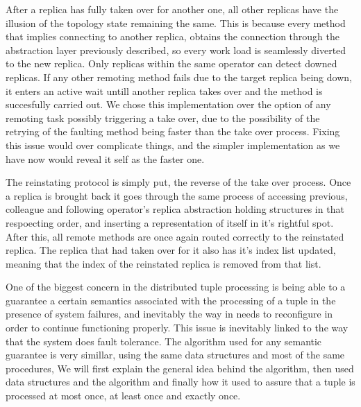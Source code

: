 \documentclass[times, 10pt,twocolumn]{article}
\begin{document}
After a replica has fully taken over for another one, all other replicas have the illusion of the topology state remaining the same. This is because every method that implies connecting to another replica, obtains the connection through the abstraction layer previously described, so every work load is seamlessly diverted to the new replica.
Only replicas within the same operator can detect downed replicas. If any other remoting method fails due to the target replica being down, it enters an active wait untill another replica takes over and the method is succesfully carried out. We chose this implementation over the option of any remoting task possibly triggering a take over, due to the possibility of the retrying of the faulting method being faster than the take over process. Fixing this issue would over complicate things, and the simpler implementation as we have now would reveal it self as the faster one.

The reinstating protocol is simply put, the reverse of the take over process. Once a replica is brought back it goes through the same process of accessing previous, colleague and following operator's replica abstraction holding structures in that respoecting order, and inserting a representation of itself in it's rightful spot.
After this, all remote methods are once again routed correctly to the reinstated replica.
The replica that had taken over for it also has it's index list updated, meaning that the index of the reinstated replica is removed from that list.

One of the biggest concern in the distributed tuple processing is being
able to a guarantee a certain semantics associated with the processing of
a tuple in the presence of system failures, and inevitably the way in
needs to reconfigure in order to continue functioning properly. This issue
is inevitably linked to the way that the system does fault tolerance. The
algorithm used for any semantic guarantee is very simillar, using 
the same data structures and most of the same procedures,
We will first explain the general idea behind the algorithm, then used data structures and the algorithm and
finally how it used to assure that a tuple is processed at most once,
at least once and exactly once.

\end{document}
